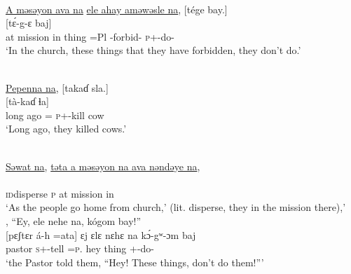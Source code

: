 \ea \label{ex:8:17}\\
\underline{A  məsəyon  ava  na}  \underline{ele  ahay  aməwəsle  na},  [tége  bay.]\\
\gll  {}                        [t\'{ɛ}-g-ɛ     baj]\\
      at  mission  in  {\PSP}  thing  =Pl   {\DEP}-forbid-{\CL}  {\PSP}    \textsc{p}+{\IFV}-do-{\CL}  {\NEG}\\
\glt  ‘In the church, these things that they have forbidden, they don’t do.’
\z


\ea \label{ex:8:18}\\
\underline{Pepenna  na},  [takaɗ  sla.]\\
\gll  {}         [tà-kaɗ     ɬa]\\
      {long ago} ={\ADV}  {\PSP}    \textsc{p}+{\PFV}-kill  cow \\
\glt  ‘Long ago, they killed cows.’
\z


\ea \label{ex:8:19}\\
\uline{Səwat  na},  \uline{təta  a  məsəyon  na  ava  nəndəye  na},\\ 
\gll  {}                        \\
      \textsc{id}disperse  {\PSP}  \textsc{p} at  mission  {\PSP}    in  {\DEM}  {\PSP}\\
\glt  ‘As the people go home from church,' (lit. disperse, they in the mission there),’\\
,   “Ey, ele  nehe  na,  kógom  bay!”\\
\gll  {}[{pɛʃtɛr} {á-h} {=ata}] {ɛj} {ɛlɛ} {nɛhɛ} {na} {k\'{ɔ}-gʷ{}-ɔm} {baj}\\
      pastor  \textsc{s}+{\IFV}-tell  =\textsc{p}.{\IO}   hey    thing  {\DEM}  {\PSP}  +{\IFV}-do-{\twoP}    {\NEG}\\
\glt  ‘the Pastor told them, “Hey! These things, don’t do them!”’
\z


